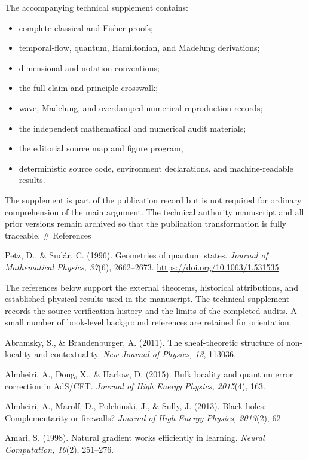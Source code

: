 \documentclass[
  11pt,
]{article}
\providecommand{\tightlist}{%
  \setlength{\itemsep}{0pt}\setlength{\parskip}{0pt}}
\begin{document}
The accompanying technical supplement contains:

\begin{itemize}
\tightlist
\item
  complete classical and Fisher proofs;
\item
  temporal-flow, quantum, Hamiltonian, and Madelung derivations;
\item
  dimensional and notation conventions;
\item
  the full claim and principle crosswalk;
\item
  wave, Madelung, and overdamped numerical reproduction records;
\item
  the independent mathematical and numerical audit materials;
\item
  the editorial source map and figure program;
\item
  deterministic source code, environment declarations, and
  machine-readable results.
\end{itemize}

The supplement is part of the publication record but is not required for
ordinary comprehension of the main argument. The technical authority
manuscript and all prior versions remain archived so that the
publication transformation is fully traceable. \# References

Petz, D., \& Sudár, C. (1996). Geometries of quantum states.
\emph{Journal of Mathematical Physics, 37}(6), 2662--2673.
\url{https://doi.org/10.1063/1.531535}

The references below support the external theorems, historical
attributions, and established physical results used in the manuscript.
The technical supplement records the source-verification history and the
limits of the completed audits. A small number of book-level background
references are retained for orientation.

Abramsky, S., \& Brandenburger, A. (2011). The sheaf-theoretic structure
of non-locality and contextuality. \emph{New Journal of Physics, 13},
113036.

Almheiri, A., Dong, X., \& Harlow, D. (2015). Bulk locality and quantum
error correction in AdS/CFT. \emph{Journal of High Energy Physics,
2015}(4), 163.

Almheiri, A., Marolf, D., Polchinski, J., \& Sully, J. (2013). Black
holes: Complementarity or firewalls? \emph{Journal of High Energy
Physics, 2013}(2), 62.

Amari, S. (1998). Natural gradient works efficiently in learning.
\emph{Neural Computation, 10}(2), 251--276.
\end{document}
